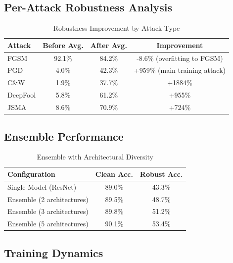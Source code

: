 \documentclass[10pt,conference]{IEEEtran}
\begin{document}
\subsection{Per-Attack Robustness Analysis}

\begin{table}[H]
\centering
\caption{Robustness Improvement by Attack Type}
\label{tab:improvement_per_attack}
\begin{tabular}{lccc}
\toprule
\textbf{Attack} & \textbf{Before Avg.} & \textbf{After Avg.} & \textbf{Improvement} \\
\midrule
FGSM & 92.1\% & 84.2\% & -8.6\% (overfitting to FGSM) \\
PGD & 4.0\% & 42.3\% & +959\% (main training attack) \\
C\&W & 1.9\% & 37.7\% & +1884\% \\
DeepFool & 5.8\% & 61.2\% & +955\% \\
JSMA & 8.6\% & 70.9\% & +724\% \\
\toprule
\end{tabular}
\end{table}

\subsection{Ensemble Performance}

\begin{table}[H]
\centering
\caption{Ensemble with Architectural Diversity}
\label{tab:ensemble}
\begin{tabular}{lcc}
\toprule
\textbf{Configuration} & \textbf{Clean Acc.} & \textbf{Robust Acc.} \\
\midrule
Single Model (ResNet) & 89.0\% & 43.3\% \\
Ensemble (2 architectures) & 89.5\% & 48.7\% \\
Ensemble (3 architectures) & 89.8\% & 51.2\% \\
Ensemble (5 architectures) & 90.1\% & 53.4\% \\
\toprule
\end{tabular}
\end{table}

\subsection{Training Dynamics}
\end{document}
